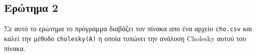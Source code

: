 \subsection{Ερώτημα 2}

Σε αυτό το ερώτημα το πρόγραμμα διαβάζει τον πίνακα
απο ένα αρχείο \texttt{cho.csv}
και καλεί την μέθοδο \texttt{cholesky(A)} η οποία τυπώνει την ανάλυση
Cholesky αυτού του πίνακα. 


